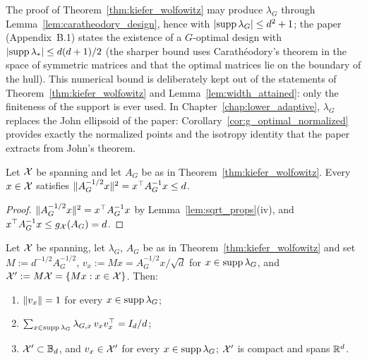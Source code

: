 \begin{remark}\label{rem:design_kw_support}
The proof of Theorem~\ref{thm:kiefer_wolfowitz} may produce $\lambda_G$ through
Lemma~\ref{lem:caratheodory_design}, hence with $\lvert \operatorname{supp}\lambda_G \rvert \le d^2 + 1$; the
paper (Appendix~B.1) states the existence of a $G$-optimal design with
$\lvert \operatorname{supp}\lambda_* \rvert \le d(d+1)/2$ (the sharper bound uses Carath\'eodory's theorem in the
space of symmetric matrices and that the optimal matrices lie on the boundary of the hull). This
numerical bound is deliberately kept out of the statements of
Theorem~\ref{thm:kiefer_wolfowitz} and Lemma~\ref{lem:width_attained}: only the finiteness of
the support is ever used. In
Chapter~\ref{chap:lower_adaptive}, $\lambda_G$ replaces the John ellipsoid of the paper:
Corollary~\ref{cor:g_optimal_normalized} provides exactly the normalized points and the isotropy
identity that the paper extracts from John's theorem.
\end{remark}

\begin{corollary}\label{cor:g_optimal_norm_bound}
\leanok
{}
Let $\mathcal{X}$ be spanning and let $A_G$ be as in Theorem~\ref{thm:kiefer_wolfowitz}. Every $x \in \mathcal{X}$ satisfies
$\lVert A_G^{-1/2}x \rVert^2 = x^\top A_G^{-1}x \le d$.
\end{corollary}

\begin{proof}
\leanok
{}
$\lVert A_G^{-1/2}x \rVert^2 = x^\top A_G^{-1}x$ by Lemma~\ref{lem:sqrt_props}(iv), and
$x^\top A_G^{-1} x \le g_{\mathcal{X}}(A_G) = d$.
\end{proof}

\begin{corollary}\label{cor:g_optimal_normalized}
\leanok
{}
Let $\mathcal{X}$ be spanning, let $\lambda_G$, $A_G$ be as in Theorem~\ref{thm:kiefer_wolfowitz} and set $M := d^{-1/2}A_G^{-1/2}$,
$v_x := Mx = A_G^{-1/2}x/\sqrt d$ for $x \in \operatorname{supp}\lambda_G$, and
$\mathcal{X}' := M\mathcal{X} = \{Mx : x \in \mathcal{X}\}$. Then:
\begin{enumerate}
  \item[(i)] $\lVert v_x \rVert = 1$ for every $x \in \operatorname{supp}\lambda_G$;
  \item[(ii)] $\sum_{x \in \operatorname{supp}\lambda_G}\lambda_{G,x}\, v_xv_x^\top = I_d/d$;
  \item[(iii)] $\mathcal{X}' \subset \mathbb{B}_d$, and $v_x \in \mathcal{X}'$ for every $x \in \operatorname{supp}\lambda_G$;
        $\mathcal{X}'$ is compact and spans $\mathbb{R}^d$.
\end{enumerate}
\end{corollary}

